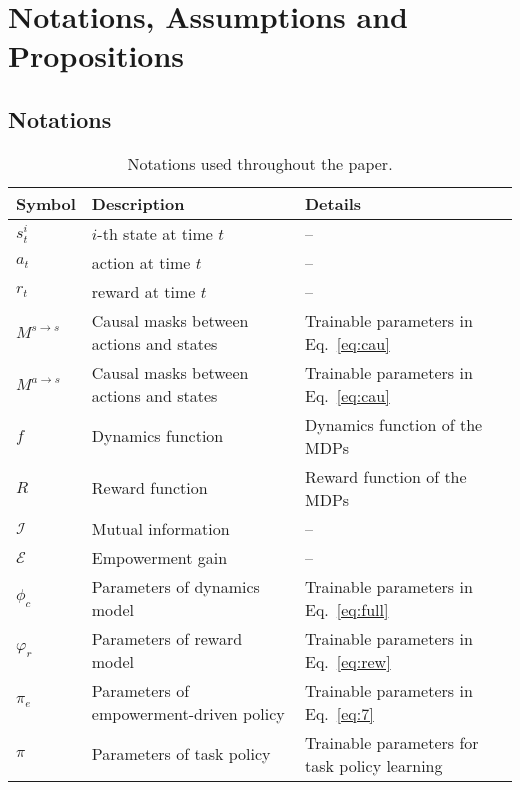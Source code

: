 \section{Notations, Assumptions and Propositions}
\label{sec:ass}
\subsection{Notations}

\begin{table}[ht]
    \centering
    \renewcommand{\arraystretch}{1.3} %
    \begin{tabular}{@{}llp{5cm}@{}}
        \toprule
        \textbf{Symbol} & \textbf{Description} & \textbf{Details} \\ \midrule
        $s^i_t$ & $i$-th state at time $t$  & -- \\
        $a_t$ & action at time $t$ & -- \\
        $r_t$ & reward at time $t$ & -- \\
        $M^{s \to s}$ & Causal masks between actions and states & Trainable parameters in Eq.~\ref{eq:cau}\\
        $M^{a \to s}$ & Causal masks between actions and states & Trainable parameters in Eq.~\ref{eq:cau}\\
        $f$ & Dynamics function  & Dynamics function of the MDPs \\
        $R$ & Reward function  & Reward function of the MDPs \\
        $\mathcal{I}$ & Mutual information  & -- \\
        $\mathcal{E}$ & Empowerment gain & -- \\
        $\phi_c$ & Parameters of dynamics model & Trainable parameters in Eq.~\ref{eq:full} \\
        $\varphi_{r}$ & Parameters of reward model & Trainable parameters in Eq.~\ref{eq:rew} \\
        $\pi_e$ & Parameters of empowerment-driven policy &  Trainable parameters in Eq.~\ref{eq:7} \\
        $\pi$ & Parameters of task policy &  Trainable parameters for task policy learning \\
        \bottomrule
    \end{tabular}
    \caption{Notations used throughout the paper.}
    \label{tab:notations}
\end{table}

